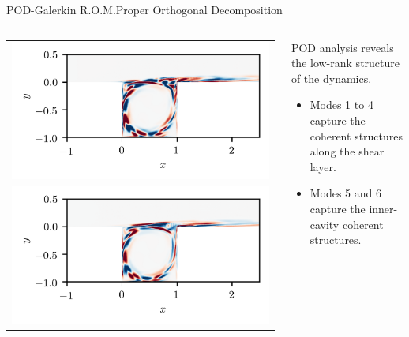 \documentclass[usenames,dvipsnames,svgnames,10pt,aspectratio=169]{beamer}
\begin{document}
\begin{frame}[t, c]{POD-Galerkin R.O.M.}{Proper Orthogonal Decomposition}
	\begin{columns}
		\begin{column}{.5\textwidth}
			\centering
			\begin{tabular}{c}
				\includegraphics[width=.8\textwidth]{PCA_mode_4} \\
				\includegraphics[width=.8\textwidth]{PCA_mode_5}
			\end{tabular}
		\end{column}
		\begin{column}{.5\textwidth}
			POD analysis reveals the low-rank structure of the dynamics.
			\medskip
			\begin{itemize}
				\item Modes 1 to 4 capture the coherent structures along the shear layer.
				\medskip
				\item Modes 5 and 6 capture the inner-cavity coherent structures.
			\end{itemize}
			\vspace{1cm}
		\end{column}
	\end{columns}
\end{frame}
\end{document}
